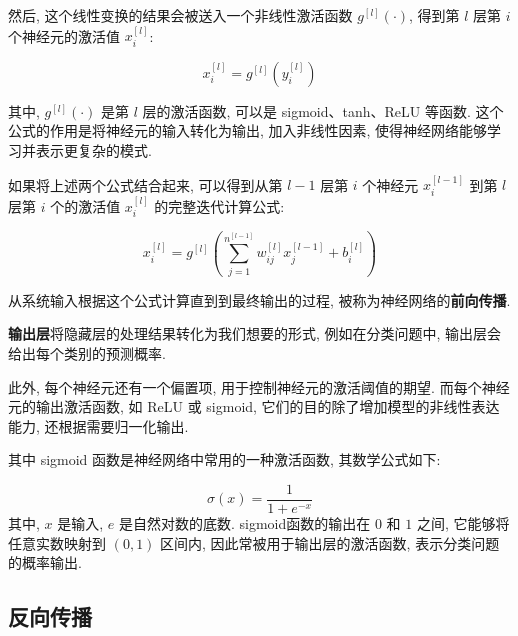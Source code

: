 \documentclass{ctexart}
\begin{document}
然后, 这个线性变换的结果会被送入一个非线性激活函数 $g^{[l]}(\cdot)$, 得到第 $l$ 层第 $i$ 个神经元的激活值 $x^{[l]}_i$:

\begin{equation}
    x^{[l]}_i = g^{[l]}(y^{[l]}_i)
\end{equation}

其中, $g^{[l]}(\cdot)$ 是第 $l$ 层的激活函数, 可以是 sigmoid、tanh、ReLU 等函数. 这个公式的作用是将神经元的输入转化为输出,
加入非线性因素, 使得神经网络能够学习并表示更复杂的模式.

如果将上述两个公式结合起来, 可以得到从第 $l - 1$ 层第 $i$ 个神经元 $x^{[l - 1]}_i$
到第 $l$ 层第 $i$ 个的激活值 $x^{[l]}_i$ 的完整迭代计算公式:

\begin{equation}
    x^{[l]}_i = g^{[l]}\left(\sum_{j=1}^{n^{[l-1]}} w^{[l]}_{ij} x^{[l-1]}_j + b^{[l]}_i\right)
\end{equation}

从系统输入根据这个公式计算直到到最终输出的过程, 被称为神经网络的{\bfseries 前向传播}.

{\bfseries 输出层}将隐藏层的处理结果转化为我们想要的形式, 例如在分类问题中, 输出层会给出每个类别的预测概率.

此外, 每个神经元还有一个偏置项, 用于控制神经元的激活阈值的期望. 而每个神经元的输出激活函数, 
如 ReLU 或 sigmoid, 它们的目的除了增加模型的非线性表达能力\cite{glorot2011deep}, 
还根据需要归一化输出. 

其中 sigmoid 函数是神经网络中常用的一种激活函数, 其数学公式如下:

\begin{equation}
    \sigma(x) = \frac{1}{1 + e^{-x}}
\end{equation}
其中, $x$ 是输入, $e$ 是自然对数的底数. sigmoid函数的输出在 $0$ 和 $1$ 之间, 它能够将任意实数映射到 $(0, 1)$ 区间内,
因此常被用于输出层的激活函数, 表示分类问题的概率输出.

\subsection{反向传播}


\end{document}
